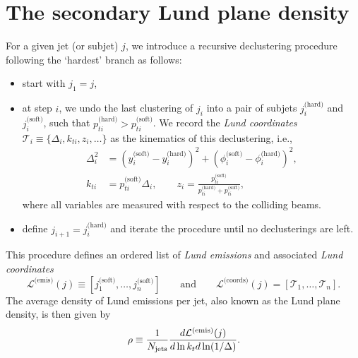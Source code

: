 \documentclass[a4paper,11pt]{article}
\begin{document}
\section{The secondary Lund plane density}
\label{sec:rhos-def}

For a given jet (or subjet) $j$, we introduce a recursive declustering procedure following the `hardest' branch as follows:
\begin{itemize}
  \item start with $j_1=j$,
  \item at step $i$, we undo the last clustering of $j_i$ into a pair of subjets $j_i^\text{(hard)}$ and $j_i^\text{(soft)}$, such that $p_{ti}^\text{(hard)}>p_{ti}^\text{(soft)}$. We record the \textit{Lund coordinates} $\mathcal{T}_i\equiv\{\Delta_i,k_{ti},z_i,\dots\}$ as the kinematics of this declustering, i.e.,
  \begin{subequations}\label{eq:z-def}
  \begin{align}
    \Delta^2_i & = (y_i^\text{(soft)}-y_i^\text{(hard)})^2 + (\phi_i^\text{(soft)}-\phi_i^\text{(hard)})^2 , \\
    k_{ti} &= p_{ti}^\text{(soft)}\Delta_{i},   
    \qquad z_i = \frac{p_{ti}^\text{(soft)}}{p_{ti}^\text{(hard)}+p_{ti}^\text{(soft)}},
  \end{align}
  \end{subequations}
  where all variables are measured with respect to the colliding beams. 
  \item define $j_{i+1}=j_i^\text{(hard)}$ and iterate the procedure until no declusterings are left.
\end{itemize}
%
This procedure defines an ordered list of \textit{Lund emissions} and associated \textit{Lund coordinates} 
\begin{equation}
 \mathcal{L}^\text{(emis)}(j)\equiv [j_1^\text{(soft)}, \dots, j_n^\text{(soft)}]
 \qquad\text{and}\qquad \mathcal{L}^\text{(coords)}(j)=[\mathcal{T}_1,\dots,\mathcal{T}_n].
 \end{equation}
%
The average density of Lund emissions per jet, also known as the Lund plane density, is then given by
%
\begin{equation}
\label{eq:LP-density}
\rho \equiv \frac{1}{N_{\rm jets}}\frac{d\mathcal{L}^\text{(emis)}(j)}{d\ln k_t d \ln (1/\Delta)}.
\end{equation}
%
\end{document}
